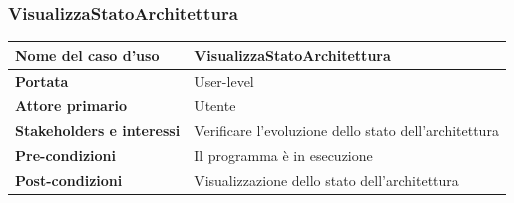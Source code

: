 \documentclass[11pt]{article}
\begin{document}
\subsubsection{VisualizzaStatoArchitettura}
\begin{table}[h]
\begin{tabular}{|l|l|}
\hline
\textbf{Nome del caso d'uso}      & VisualizzaStatoArchitettura                                                                                                                                                                                                                                                                             \\ \hline
\textbf{Portata}                  & User-level                                                                                                                                                                                                                                                                                              \\ \hline
\textbf{Attore primario}          & Utente                                                                                                                                                                                                                                                                                                  \\ \hline
\textbf{Stakeholders e interessi} & Verificare l'evoluzione dello stato dell'architettura                                                                                                                                                                                                                                                   \\ \hline
\textbf{Pre-condizioni}           & Il programma è in esecuzione                                                                                                                                                                                                                                                                        \\ \hline
\textbf{Post-condizioni}          & Visualizzazione dello stato dell'architettura                                                                                                                                                                                                                                                           \\ \hline

\end{tabular}
\end{table}
\end{document}

